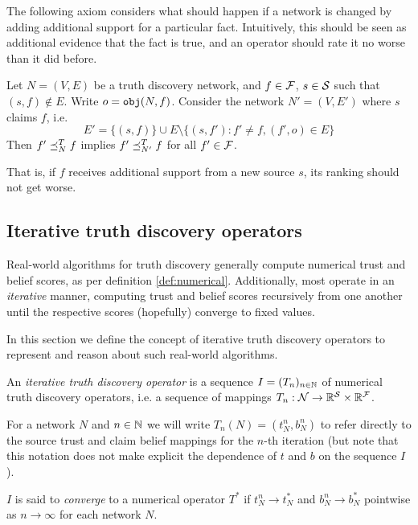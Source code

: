 \documentclass[../main.tex]{subfiles}
\begin{document}
The following axiom considers what should happen if a network is changed by
adding additional support for a particular fact. Intuitively, this should be
seen as additional evidence that the fact is true, and an operator should rate
it no worse than it did before.


\begin{axiom}[Monotonicity]
Let $N = (V, E)$ be a truth discovery network, and $f \in \F$, $s \in \S$ such
that $(s, f) \notin E$. Write $o = \obj(N, f)$. Consider the network $N'=(V,
E')$ where $s$ claims $f$, i.e.
$$
    E' = \{(s, f)\} \cup E \setminus \{(s, f') : f' \ne f, (f', o) \in E\}
$$
Then $f' \fle_N^T f$ implies $f' \fle_{N'}^T f$ for all $f' \in \F$.

That is, if $f$ receives additional support from a new source $s$, its ranking
should not get worse.
\end{axiom}



\subsection{Iterative truth discovery operators}

Real-world algorithms for truth discovery generally compute numerical trust and
belief scores, as per definition \ref{def:numerical}. Additionally, most
operate in an \emph{iterative} manner, computing trust and belief scores
recursively from one another until the respective scores (hopefully) converge
to fixed values.

In this section we define the concept of iterative truth discovery operators to
represent and reason about such real-world algorithms.

\begin{definition}
\label{def:iterative_operator}

An \emph{iterative truth discovery operator} is a sequence $I=(T_n)_{n \in
\Nat}$ of numerical truth discovery operators, i.e. a sequence of mappings $T_n
: \N \rightarrow \R^\S \times \R^\F$.

For a network $N$ and $n \in \Nat$ we will write $T_n(N) = (t_N^n, b_N^n)$ to
refer directly to the source trust and claim belief mappings for the $n$-th
iteration (but note that this notation does not make explicit the dependence of
$t$ and $b$ on the sequence $I$).

$I$ is said to \emph{converge} to a numerical operator $T^*$ if $t_N^n
\rightarrow t_N^*$ and $b_N^n \rightarrow b_N^*$ pointwise as $n \rightarrow
\infty$ for each network $N$.

\end{definition}
\end{document}
